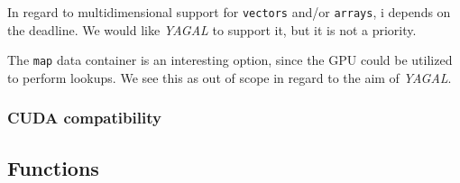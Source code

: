 In regard to multidimensional support for \texttt{vectors} and/or \texttt{arrays}, i depends on the deadline. We would like \textit{YAGAL} to support it, but it is not a priority.

The \texttt{map} data container is an interesting option, since the GPU could be utilized to perform lookups. We see this as out of scope in regard to the aim of \textit{YAGAL}.

\subsubsection{CUDA compatibility}

\subsection{Functions}
